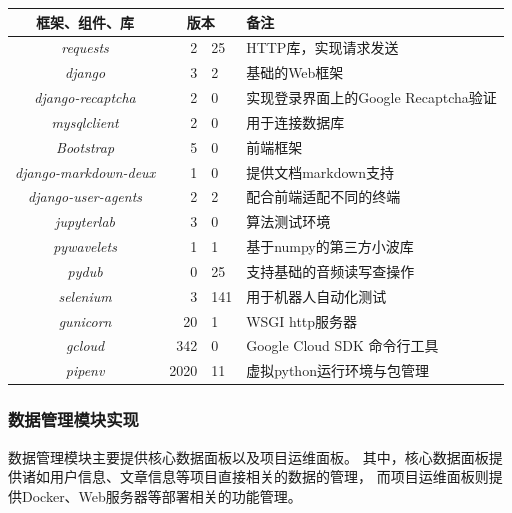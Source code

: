 \documentclass{morningstar}
\begin{document}
\begin{table}[htbp]
    \centering
    \begin{tabular}{cr@{.}ll}
    \hline
    \textbf{框架、组件、库}          & \multicolumn{2}{c}{\textbf{版本}} & \textbf{备注}                \\
    \hline
    \textit{requests}                  & 2 & 25         & HTTP库，实现请求发送             \\
    \textit{django}                     & 3 & 2         & 基础的Web框架                   \\
    \textit{django-recaptcha}           & 2 & 0         & 实现登录界面上的Google Recaptcha验证 \\
    \textit{mysqlclient}                & 2 & 0         & 用于连接数据库                    \\
    \textit{Bootstrap}                  & 5 & 0         & 前端框架                      \\
    \textit{django-markdown-deux}       & 1 & 0         & 提供文档markdown支持             \\
    \textit{django-user-agents}         & 2 & 2         & 配合前端适配不同的终端                \\
    \textit{jupyterlab}                 & 3 & 0         & 算法测试环境                     \\
    \textit{pywavelets}                 & 1 & 1         & 基于numpy的第三方小波库             \\
    \textit{pydub}                      & 0 & 25        & 支持基础的音频读写查操作               \\
    \textit{selenium}                   & 3 & 141       & 用于机器人自动化测试                \\
    \textit{gunicorn}                   & 20& 1         & WSGI http服务器               \\
    \textit{gcloud}                     & 342 & 0       & Google Cloud SDK 命令行工具   \\
    \textit{pipenv}                     & 2020 & 11     & 虚拟python运行环境与包管理      \\ 
    \hline
    \end{tabular}
\end{table}

\subsubsection{数据管理模块实现}
数据管理模块主要提供核心数据面板以及项目运维面板。
其中，核心数据面板提供诸如用户信息、文章信息等项目直接相关的数据的管理，
而项目运维面板则提供Docker、Web服务器等部署相关的功能管理。
\end{document}
